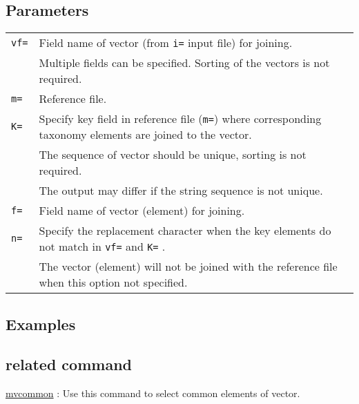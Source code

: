 \subsection*{Parameters}
\begin{table}[htbp]
{\small
\begin{tabular}{ll}
\verb|vf=| & Field name of vector (from \verb|i=| input file) for joining. \\
           & Multiple fields can be specified. Sorting of the vectors is not required. \\
\verb|m=|  & Reference file. \\
\verb|K=|  &  Specify key field in reference file (\verb|m=|) where corresponding taxonomy elements are joined to the vector.  \\
           & The sequence of vector should be unique, sorting is not required. \\
           & The output may differ if the string sequence is not unique. \\
\verb|f=|  &  Field name of vector (element) for joining. \\
\verb|n=|  & Specify the replacement character when the key elements do not match in \verb|vf=| and \verb|K=| . \\
           & The vector (element) will not be joined with the reference file when this option not specified.  \\
\end{tabular}
}
\end{table} 


\subsection*{Examples}


\subsection*{related command}
\hyperref[sect:mvcommon]{mvcommon} : Use this command to select common elements of vector. 

%
